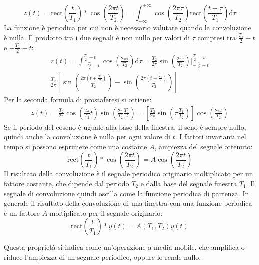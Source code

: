 \documentclass{article}
\newcommand{\rect}{\mathrm{rect}}
\newcommand{\df}{\mathrm{d}}
\numberwithin{equation}{subsection}
\begin{document}
\begin{equation*}
    z(t)=\rect\displaystyle\left(\frac{t}{T_1}\right)*\cos\left(\frac{2\pi t}{T_2}\right)=\int_{-\infty}^{+\infty}\cos\left(\frac{2\pi \tau}{T_2}\right)\rect\displaystyle\left(\frac{t-\tau}{T_1}\right)\df\tau
\end{equation*}
La funzione è periodica per cui non è necessario valutare quando la convoluzione è nulla. Il prodotto tra i due segnali è non nullo per valori di $\tau$ compresi tra 
$\displaystyle\frac{T_1}{2}-t$ e $-\displaystyle\frac{T_1}{2}-t$:
\begin{gather*}
    z(t)=\displaystyle\int_{-\frac{T_1}{2}-t}^{\frac{T_1}{2}-t}\cos\left(\frac{2\pi\tau}{T_2}\right)\df\tau=\frac{T_2}{2\pi}\sin\left(\frac{2\pi\tau}{T_2}\right)\Bigg|_{-\frac{T_1}{2}-t}^{\frac{T_1}{2}-t}\\
    \displaystyle\frac{T_2}{2\pi}\left[\sin\left(\frac{2\pi(t+\frac{T_1}{2})}{T_2}\right)-\sin\left(\frac{2\pi(t-\frac{T_1}{2})}{T_2}\right)\right]
\end{gather*}
Per la seconda formula di prostaferesi si ottiene:
\begin{gather*}
    z(t)=\displaystyle\frac{T_2}{2\pi}\cos\left(\frac{2\pi}{T_2}t\right)\sin\left(\frac{2\pi}{T_2}\frac{T_1}{2}\right)=\left[\frac{T_2}{2\pi}\sin\left(\pi\frac{T_1}{T_2}\right)\right]\cos\left(\frac{2\pi t}{T_2}\right)
\end{gather*}
Se il periodo del coseno è uguale alla base della finestra, il seno è sempre nullo, quindi anche la convoluzione è nulla per ogni valore di $t$. I fattori invarianti nel 
tempo si possono esprimere come una costante $A$, ampiezza del segnale ottenuto:
\begin{equation*}
    \rect\left(\displaystyle\frac{t}{T_1}\right)*\cos\left(\frac{2\pi t}{T_2}\right)=A\cos\left(\frac{2\pi t}{T_2}\right)
\end{equation*}  
Il risultato della convoluzione è il segnale periodico originario moltiplicato per un fattore costante, che dipende dal periodo $T_2$ e dalla base del segnale finestra $T_1$. 
Il segnale di convoluzione quindi oscilla come la funzione periodica di partenza. In generale il risultato della convoluzione di una finestra con una funzione periodica è un fattore 
$A$ moltiplicato per il segnale originario:
\begin{equation}
    \rect\left(\frac{t}{T_1}\right)*y(t)=A(T_1,T_2)y(t)
\end{equation}

Questa proprietà si indica come un'operazione a media mobile, che amplifica o riduce l'ampiezza di un segnale periodico, oppure lo rende nullo. 
\end{document}
